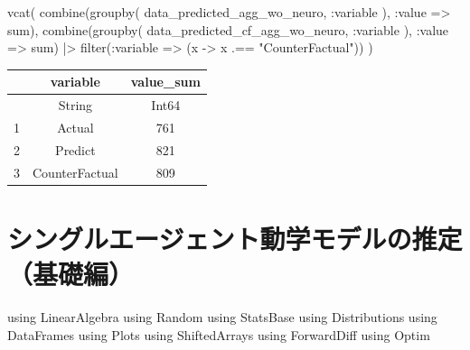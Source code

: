 \documentclass[
  letterpaper,
  DIV=11,
  numbers=noendperiod]{scrreprt}
\newenvironment{Shaded}{\begin{snugshade}}{\end{snugshade}}
\newcommand{\BuiltInTok}[1]{\textcolor[rgb]{0.00,0.23,0.31}{#1}}
\newcommand{\FunctionTok}[1]{\textcolor[rgb]{0.28,0.35,0.67}{#1}}
\newcommand{\ImportTok}[1]{\textcolor[rgb]{0.00,0.46,0.62}{#1}}
\newcommand{\NormalTok}[1]{\textcolor[rgb]{0.00,0.23,0.31}{#1}}
\newcommand{\OperatorTok}[1]{\textcolor[rgb]{0.37,0.37,0.37}{#1}}
\newcommand{\StringTok}[1]{\textcolor[rgb]{0.13,0.47,0.30}{#1}}
\begin{document}
\begin{Shaded}
\begin{Highlighting}[]
\FunctionTok{vcat}\NormalTok{(}
    \FunctionTok{combine}\NormalTok{(}\FunctionTok{groupby}\NormalTok{(}
\NormalTok{        data\_predicted\_agg\_wo\_neuro, }\OperatorTok{:}\NormalTok{variable}
\NormalTok{        ), }\OperatorTok{:}\NormalTok{value }\OperatorTok{=\textgreater{}}\NormalTok{ sum),}
    \FunctionTok{combine}\NormalTok{(}\FunctionTok{groupby}\NormalTok{(}
\NormalTok{        data\_predicted\_cf\_agg\_wo\_neuro, }\OperatorTok{:}\NormalTok{variable}
\NormalTok{        ), }\OperatorTok{:}\NormalTok{value }\OperatorTok{=\textgreater{}}\NormalTok{ sum) }\OperatorTok{|\textgreater{}} 
        \FunctionTok{filter}\NormalTok{(}\OperatorTok{:}\NormalTok{variable }\OperatorTok{=\textgreater{}}\NormalTok{ (x }\OperatorTok{{-}\textgreater{}}\NormalTok{ x }\OperatorTok{.==} \StringTok{"CounterFactual"}\NormalTok{))}
\NormalTok{)}
\end{Highlighting}
\end{Shaded}

\begin{tabular}{r|cc}
    & variable & value\_sum\\
    \hline
    & String & Int64\\
    \hline
    1 & Actual & 761 \\
    2 & Predict & 821 \\
    3 & CounterFactual & 809 \\
\end{tabular}


\hypertarget{ux30b7ux30f3ux30b0ux30ebux30a8ux30fcux30b8ux30a7ux30f3ux30c8ux52d5ux5b66ux30e2ux30c7ux30ebux306eux63a8ux5b9aux57faux790eux7de8}{%
\chapter{シングルエージェント動学モデルの推定（基礎編）}\label{ux30b7ux30f3ux30b0ux30ebux30a8ux30fcux30b8ux30a7ux30f3ux30c8ux52d5ux5b66ux30e2ux30c7ux30ebux306eux63a8ux5b9aux57faux790eux7de8}}

\begin{Shaded}
\begin{Highlighting}[]
\ImportTok{using} \BuiltInTok{LinearAlgebra}
\ImportTok{using} \BuiltInTok{Random}
\ImportTok{using} \BuiltInTok{StatsBase}
\ImportTok{using} \BuiltInTok{Distributions}
\ImportTok{using} \BuiltInTok{DataFrames}
\ImportTok{using} \BuiltInTok{Plots}
\ImportTok{using} \BuiltInTok{ShiftedArrays}
\ImportTok{using} \BuiltInTok{ForwardDiff}
\ImportTok{using} \BuiltInTok{Optim}
\end{Highlighting}
\end{Shaded}
\end{document}
